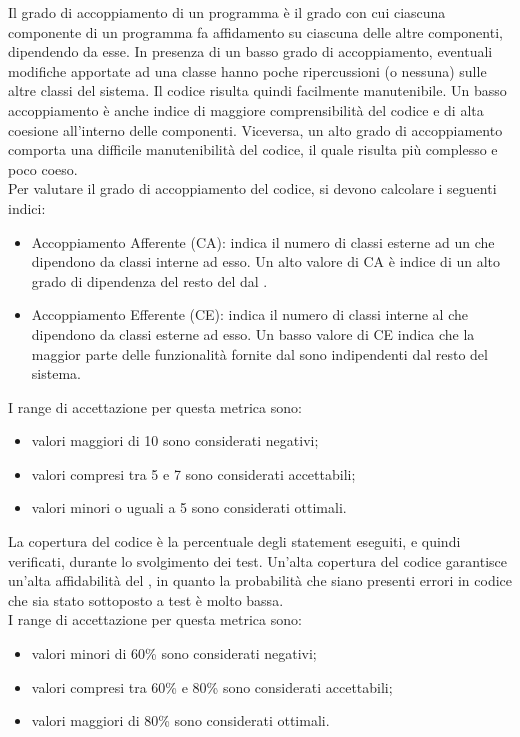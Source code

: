 		Il grado di accoppiamento di un programma è il grado con cui ciascuna componente di un programma fa affidamento su ciascuna delle altre componenti, dipendendo da esse. In presenza di un basso grado di accoppiamento, eventuali modifiche apportate ad una classe hanno poche ripercussioni (o nessuna) sulle altre classi del sistema. Il codice risulta quindi facilmente manutenibile. Un basso accoppiamento è anche indice di maggiore comprensibilità del codice e di alta coesione all'interno delle componenti. Viceversa, un alto grado di accoppiamento comporta una difficile manutenibilità del codice, il quale risulta più complesso e poco coeso.\\
		Per valutare il grado di accoppiamento del codice, si devono calcolare i seguenti indici:
		\begin{itemize}
			\item Accoppiamento Afferente (CA): indica il numero di classi esterne ad un  che dipendono da classi interne ad esso. Un alto valore di CA è indice di un alto grado di dipendenza del resto del  dal .
			\item Accoppiamento Efferente (CE): indica il numero di classi interne al  che dipendono da classi esterne ad esso. Un basso valore di CE indica che la maggior parte delle funzionalità fornite dal  sono indipendenti dal resto del sistema.
		\end{itemize}
		I range di accettazione per questa metrica sono:
		\begin{itemize}
			\item valori maggiori di 10 sono considerati negativi;
			\item valori compresi tra 5 e 7 sono considerati accettabili;
			\item valori minori o uguali a 5 sono considerati ottimali.
		\end{itemize}
			
		La copertura del codice è la percentuale degli statement eseguiti, e quindi verificati, durante lo svolgimento dei test. Un'alta copertura del codice garantisce un'alta affidabilità del , in quanto la probabilità che siano presenti errori in codice che sia stato sottoposto a test è molto bassa.\\
		I range di accettazione per questa metrica sono:
		\begin{itemize}
			\item valori minori di 60\% sono considerati negativi;
			\item valori compresi tra 60\% e 80\% sono considerati accettabili;
			\item valori maggiori di 80\% sono considerati ottimali.
		\end{itemize}
		
